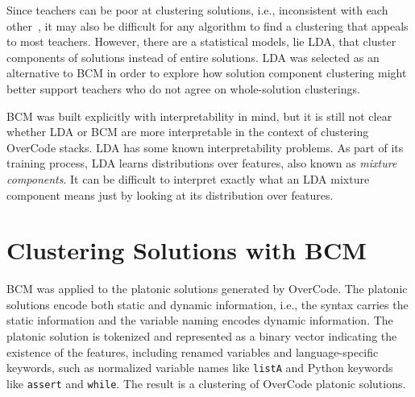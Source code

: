 Since teachers can be poor at clustering solutions, i.e., inconsistent with each other~\cite{berkeleymastersthesis}, it may also be difficult for any algorithm to find a clustering that appeals to most teachers. However, there are a statistical models, lie LDA, that cluster components of solutions instead of entire solutions. LDA was selected as an alternative to BCM in order to explore how solution component clustering might better support teachers who do not agree on whole-solution clusterings.


BCM was built explicitly with interpretability in mind, but it is still not clear whether LDA or BCM are more interpretable in the context of clustering OverCode stacks. LDA has some known interpretability problems. As part of its training process, LDA learns distributions over features, also known as {\it mixture components}. It can be difficult to interpret exactly what an LDA mixture component means just by looking at its distribution over features.




\section{Clustering Solutions with BCM}

BCM was applied to the platonic solutions generated by OverCode. The platonic solutions encode both static and dynamic information, i.e., the syntax carries the static information and the variable naming encodes dynamic information. The platonic solution is tokenized and represented as a binary vector indicating the existence of the features, including renamed variables and language-specific keywords, such as normalized variable names like \texttt{listA} and Python keywords like \texttt{assert} and \texttt{while}. The result is a clustering of OverCode platonic solutions. 

